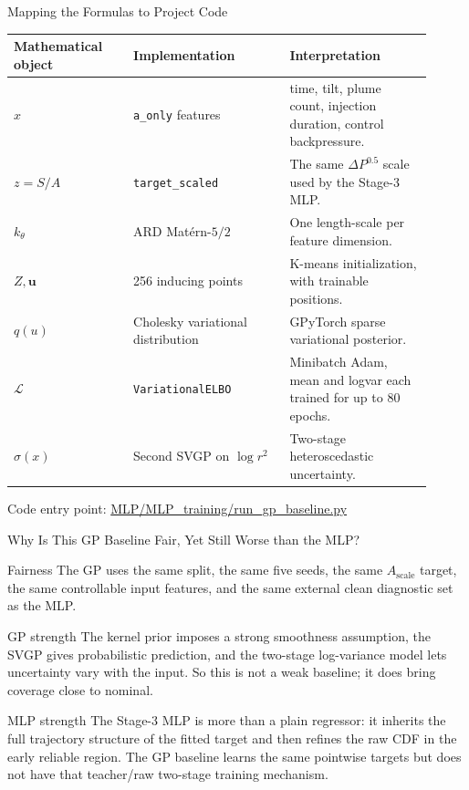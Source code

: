 \documentclass[aspectratio=169,11pt]{beamer}
\newcommand{\sourcepath}[1]{{\scriptsize\url{#1}}}
\begin{document}
\begin{frame}{Mapping the Formulas to Project Code}
\scriptsize
\begin{tabular}{L{0.26\linewidth}L{0.34\linewidth}L{0.31\linewidth}}
\toprule
Mathematical object & Implementation & Interpretation \\
\midrule
\(x\) &
\texttt{a\_only} features &
time, tilt, plume count, injection duration, control backpressure. \\
\(z=S/A\) &
\texttt{target\_scaled} &
The same \(\Delta P^{0.5}\) scale used by the Stage-3 MLP. \\
\(k_\theta\) &
ARD Mat\'ern-\(5/2\) &
One length-scale per feature dimension. \\
\(Z,\mathbf u\) &
256 inducing points &
K-means initialization, with trainable positions. \\
\(q(u)\) &
Cholesky variational distribution &
GPyTorch sparse variational posterior. \\
\(\mathcal L\) &
\texttt{VariationalELBO} &
Minibatch Adam, mean and logvar each trained for up to 80 epochs. \\
\(\sigma(x)\) &
Second SVGP on \(\log r^2\) &
Two-stage heteroscedastic uncertainty. \\
\bottomrule
\end{tabular}

\vspace{0.5em}
\footnotesize
Code entry point: \sourcepath{MLP/MLP_training/run_gp_baseline.py}
\end{frame}

\begin{frame}{Why Is This GP Baseline Fair, Yet Still Worse than the MLP?}
\small
\begin{block}{Fairness}
\footnotesize
The GP uses the same split, the same five seeds, the same \(A_{\mathrm{scale}}\) target, the same controllable
input features, and the same external clean diagnostic set as the MLP.
\end{block}

\begin{block}{GP strength}
\footnotesize
The kernel prior imposes a strong smoothness assumption, the SVGP gives probabilistic prediction, and the
two-stage log-variance model lets uncertainty vary with the input. So this is not a weak baseline; it does bring
coverage close to nominal.
\end{block}

\begin{block}{MLP strength}
\footnotesize
The Stage-3 MLP is more than a plain regressor: it inherits the full trajectory structure of the fitted target and
then refines the raw CDF in the early reliable region. The GP baseline learns the same pointwise targets but does
not have that teacher/raw two-stage training mechanism.
\end{block}
\end{frame}
\end{document}
